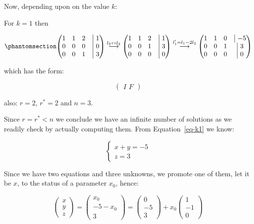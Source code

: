 \documentclass[
  letterpaper,
  DIV=11,
  numbers=noendperiod]{scrartcl}
\theoremstyle{definition}
\theoremstyle{remark}
\begin{document}
Now, depending upon on the value \(k\):

For \(k=1\) then

\begin{equation}\phantomsection\label{eq-k1}{
\begin{pmatrix} 1 & 1 & 2  &\bigm|1\\ 0 & 0 & 0 &\bigm|0\\ 0 & 0 & 1 &\bigm| 3 \end{pmatrix} \overset{l_2 \leftrightarrow l_3}{\longrightarrow} \begin{pmatrix} 1 & 1 & 2  &\bigm|1\\ 0 & 0 & 1 &\bigm|3\\ 0 & 0 & 0 &\bigm| 0 \end{pmatrix}\overset{l_1'=l_1-2l_2 }{\longrightarrow}\begin{pmatrix} 1 & 1 & 0  &\bigm|-5\\ 0 & 0 & 1 &\bigm|3\\ 0 & 0 & 0 &\bigm| 0 \end{pmatrix}
}\end{equation}

which has the form:

\[
\begin{pmatrix}I\,\,F \end{pmatrix}
\]

also: \(r=2\), \(r^*=2\) and \(n=3\).

Since \(r=r^*<n\) we conclude we have an infinite number of solutions as
we readily check by actually computing them. From Equation~\ref{eq-k1}
we know:

\[
\begin{cases}
x + y = -5\\
z=3
\end{cases}
\]

Since we have two equations and three unknowns, we promote one of them,
let it be \(x\), to the status of a parameter \(x_0\), hence:

\[
\begin{pmatrix}x\\y\\z\end{pmatrix}=\begin{pmatrix}x_0\\-5-x_0\\3\end{pmatrix}=\begin{pmatrix}0\\-5\\3\end{pmatrix}+x_0\begin{pmatrix}1\\-1\\0\end{pmatrix}
\]
\end{document}
